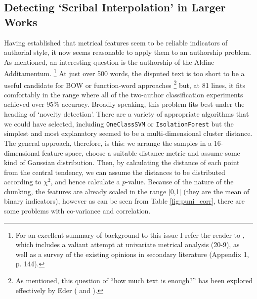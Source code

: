 \documentclass[11pt,a4paper]{scrartcl} %
\begin{document}
{\subsection{Detecting `Scribal Interpolation' in Larger Works}

Having established that metrical features seem to be reliable indicators of authorial style, it now seems reasonable to apply them to an authorship problem. As mentioned, an interesting question is the authorship of the Aldine Additamentum.%
\footnote{For an excellent summary of background to this issue I refer the reader to , which includes a valiant attempt at univariate metrical analysis (20-9), as well as a survey of the existing opinions in secondary literature (Appendix 1, p. 144).}
At just over 500 words, the disputed text is too short to be a useful candidate for BOW or function-word approaches%
\footnote{As mentioned, this question of ``how much text is enough?'' has been explored effectively by Eder ( and ).}
but, at 81 lines, it fits comfortably in the range where all of the two-author classification experiments achieved over 95\% accuracy. Broadly speaking, this problem fits best under the heading of `novelty detection'. There are a variety of appropriate algorithms that we could have selected, including \texttt{OneClassSVM} or \texttt{IsolationForest} but the simplest and most explanatory seemed to be a multi-dimensional cluster distance. The general approach, therefore, is this: we arrange the samples in a 16-dimensional feature space, choose a suitable distance metric and assume some kind of Gaussian distribution. Then, by calculating the distance of each point from the central tendency, we can assume the distances to be distributed according to $\chi^{2}$, and hence calculate a $p$-value. Because of the nature of the chunking, the features are already scaled in the range [0,1] (they are the mean of binary indicators), however as can be seen from Table \ref{fig:puni_corr}, there are some problems with co-variance and correlation.
\begin{table}
\caption{Some highly correlated features in Silius' \textit{Punica}}
\label{fig:puni_corr}
\phantom{x}
\centering
{}
\end{table}}
\end{document}
